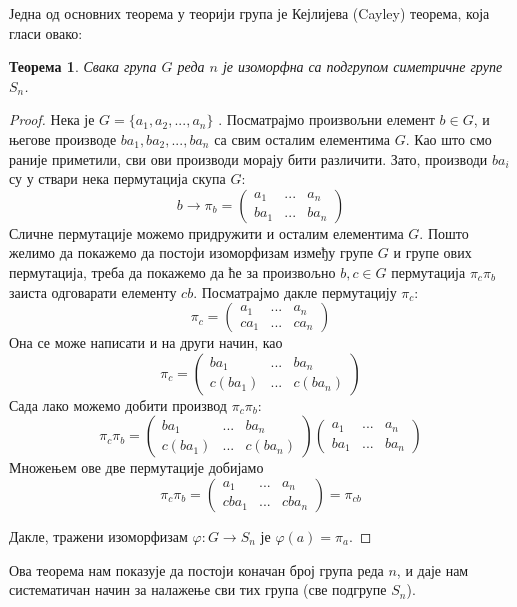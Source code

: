 \documentclass{report}
\theoremstyle{plain}
\newtheorem{thm}{Теорема}
\theoremstyle{definition}
\begin{document}
Једна од основних теорема у теорији група је Кејлијева (Cayley) теорема, која гласи овако:
\begin{thm}
Свака група $G$ реда $n$ је изоморфна са подгрупом симетричне групе $S_n$.
\end{thm}
\begin{proof}
Нека је $G = \{a_1, a_2, ..., a_n\}$ . Посматрајмо произвољни елемент $b\in G$, и његове производе $ba_1, ba_2, ..., ba_n$ са свим осталим елементима $G$. Као што смо раније приметили, сви ови производи морају бити различити. Зато, производи $ba_i$ су у ствари нека пермутација скупа $G$:
$$b\to \pi_b = \begin{pmatrix}
                a_1 & ... & a_n \\
                ba_1 & ... & ba_n
               \end{pmatrix}$$
Сличне пермутације можемо придружити и осталим елементима $G$. Пошто желимо да покажемо да постоји изоморфизам између групе $G$ и групе ових пермутација, треба да покажемо да ће за произвољно $b, c\in G$ пермутација $\pi_c \pi_b$ заиста одговарати елементу $cb$. Посматрајмо дакле пермутацију $\pi_c$:
$$\pi_c = \begin{pmatrix}
                a_1 & ... & a_n \\
                ca_1 & ... & ca_n
          \end{pmatrix}$$
Она се може написати и на други начин, као
$$\pi_c = \begin{pmatrix}
                ba_1 & ... & ba_n \\
                c(ba_1) & ... & c(ba_n)
          \end{pmatrix}$$
Сада лако можемо добити производ $\pi_c \pi_b$:
$$\pi_c \pi_b= \begin{pmatrix}
                ba_1 & ... & ba_n \\
                c(ba_1) & ... & c(ba_n)
               \end{pmatrix}
               \begin{pmatrix}
                a_1 & ... & a_n \\
                ba_1 & ... & ba_n
               \end{pmatrix}$$
Множењем ове две пермутације добијамо
$$\pi_c \pi_b= \begin{pmatrix}
                a_1 & ... & a_n \\
                cba_1 & ... & cba_n
               \end{pmatrix} = \pi_{cb}$$

Дакле, тражени изоморфизам $\varphi: G\to S_n$ је $\varphi(a) = \pi_a$.
\end{proof}
Ова теорема нам показује да постоји коначан број група реда $n$, и даје нам систематичан начин за налажење сви тих група (све подгрупе $S_n$).
\end{document}
